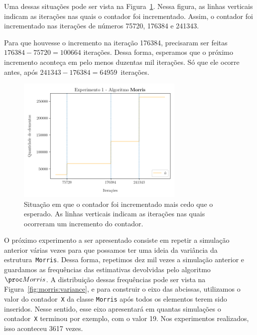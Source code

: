 Uma dessas situações pode ser vista na Figura~\ref{fig:morris:interval}. Nessa figura, as linhas verticais indicam as 
iterações nas quais o contador foi incrementado. Assim, o contador foi incrementado nas iterações de números 75720, 
176384 e 241343. 

Para que houvesse o incremento na iteração 176384, precisaram ser feitas $176384 - 75720 = 100664$ iterações. Dessa 
forma, esperamos que o próximo incremento aconteça em pelo menos duzentas mil iterações. Só que ele ocorre antes, após 
$241343 - 176384 = 64959$~iterações.

\begin{figure}[h]
  \centering
  \includegraphics[height=6cm, width=\textwidth]{figuras/morris_interval.png}
	\caption{Situação em que o contador foi incrementado mais cedo que o esperado. As linhas verticais indicam as 
  iterações nas quais ocorreram um incremento do contador. }
  \label{fig:morris:interval}
\end{figure}

O próximo experimento a ser apresentado consiste em repetir a simulação anterior várias vezes para que possamos ter uma 
ideia da variância da estrutura~\texttt{Morris}. Dessa forma, repetimos dez mil vezes a simulação anterior e guardamos 
as frequências das estimativas devolvidas pelo algoritmo~$\Morris$. A distribuição dessas frequências pode ser vista na 
Figura~\ref{fig:morris:variance}, e para construir o eixo das abcissas, utilizamos o valor do contador~\texttt{X} da 
classe \texttt{Morris} após todos os elementos terem sido inseridos. Nesse sentido, esse eixo apresentará em quantas 
simulações o contador~\texttt{X} terminou por exemplo, com o valor 19. Nos experimentos realizados, isso aconteceu 3617 
vezes.

